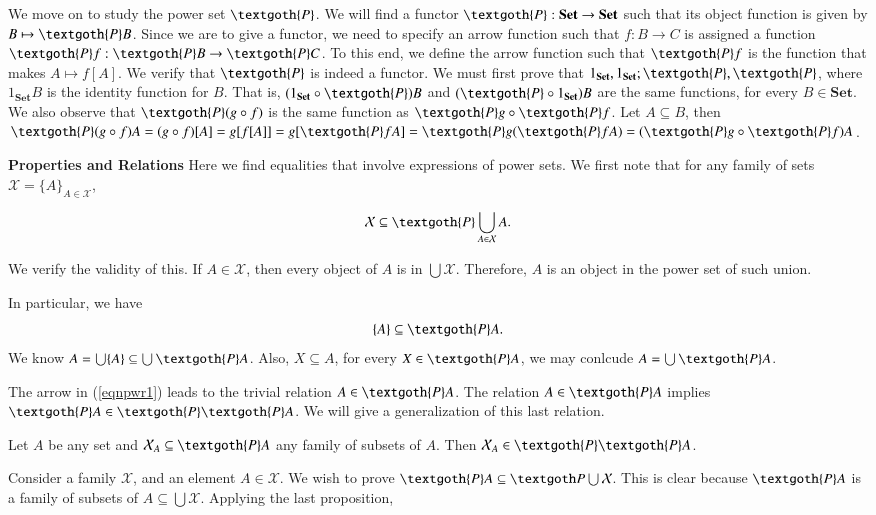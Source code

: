 \documentclass [12pt]{book}
\begin{document}
We move on to study the power set $\textgoth{P}$. We will find a functor $\textgoth{P}:\textbf{Set}\rightarrow\textbf{Set}$ such that its object function is given by $B\mapsto\textgoth{P}B$. Since we are to give a functor, we need to specify an arrow function such that $f:B\rightarrow C$ is assigned a function $\textgoth{P}f:\textgoth{P}B\rightarrow\textgoth{P}C$. To this end, we define the arrow function such that $\textgoth{P}f$ is the function that makes $A\mapsto f[A]$. We verify that $\textgoth{P}$ is indeed a functor. We must first prove that $1_{\textbf{Set}},1_{\textbf{Set}};\textgoth{P},\textgoth{P}$, where $1_{\textbf{Set}}B$ is the identity function for $B$. That is, $(1_{\textbf{Set}}\circ\textgoth{P})B$ and $(\textgoth{P}\circ1_{\textbf{Set}})B$ are the same functions, for every $B\in\textbf{Set}$. We also observe that $\textgoth{P}(g\circ f)$ is the same function as $\textgoth{P}g\circ\textgoth{P}f$. Let $A\subseteq B$, then $\textgoth{P}(g\circ f)A=(g\circ f)[A]=g[f[A]]=g[\textgoth{P}fA]=\textgoth{P}g(\textgoth{P}fA)=(\textgoth{P}g\circ
\textgoth{P}f)A$.

\textbf{Properties and Relations} Here we find equalities that involve expressions of power sets. We first note that for any family of sets $\mathcal{X}=\{A\}_{A\in\mathcal{X}}$,

$$\mathcal{X}\subseteq\textgoth{P}\bigcup_{A\in\mathcal{X}}A.$$

We verify the validity of this. If $A\in\mathcal{X}$, then every object of $A$ is in $\bigcup\mathcal{X}$. Therefore, $A$ is an object in the power set of such union. 

In particular, we have \begin{equation}\{A\}\subseteq\textgoth{P}A.\label{eqnpwr1}\end{equation}  We know $A=\bigcup\{A\}\subseteq\bigcup\textgoth{P}A$. Also, $X\subseteq A$, for every $X\in\textgoth{P}A$, we may conlcude $A=\bigcup\textgoth{P}A$.  

The arrow in (\ref{eqnpwr1}) leads to the trivial relation $A\in\textgoth{P}A$. The relation $A\in\textgoth{P}A$ implies $\textgoth{P}A\in\textgoth{P}\textgoth{P}A$. We will give a generalization of this last relation.

\begin{proposition}Let $A$ be any set and $\mathcal{X}_{A}\subseteq\textgoth{P}A$ any family of subsets of $A$. Then $\mathcal{X}_{A}\in\textgoth{P}\textgoth{P}A$.
\end{proposition}

Consider a family $\mathcal{X}$, and an element $A\in\mathcal{X}$. We wish to prove $\textgoth{P}A\subseteq\textgoth P\bigcup\mathcal{X}$. This is clear because $\textgoth{P}A$ is a family of subsets of $A\subseteq\bigcup\mathcal{X}$. Applying the last proposition, 
\end{document}
